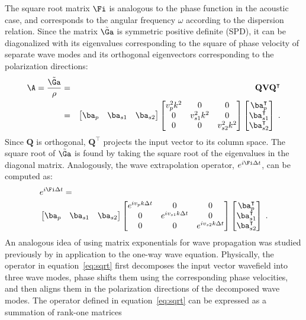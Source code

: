 The square root matrix $\Fi$ is analogous to the phase function in the acoustic case, and corresponds to the angular frequency $\omega$ according to the dispersion relation. Since the matrix $\tilde{\Ga}$ is symmetric positive definite (SPD), it can be diagonalized with its eigenvalues corresponding to the square of phase velocity of separate wave modes and its orthogonal eigenvectors corresponding to the polarization directions:
\begin{eqnarray}
    \label{eq:chris-eigen}
\A = \frac{\tilde{\Ga}}{\rho} &=& \mathbf{Q} \mathbf{V} \mathbf{Q}^\intercal \\ \nonumber 
&=& \begin{bmatrix} \ba_p & \ba_{s1} & \ba_{s2}\end{bmatrix} \begin{bmatrix} v_p^2 k^2 & 0 & 0 \\ 0 & v_{s1}^2 k^2 & 0 \\ 0 & 0 & v_{s2}^2 k^2 \end{bmatrix} \begin{bmatrix} \ba_p^\intercal \\ \ba_{s1}^\intercal \\ \ba_{s2}^\intercal \end{bmatrix} \;.
\end{eqnarray}
Since $\mathbf{Q}$ is orthogonal, $\mathbf{Q}^\intercal$ projects the input vector to its column space. The square root of $\tilde{\Ga}$ is found by taking the square root of the eigenvalues in the diagonal matrix. Analogously, the wave extrapolation operator, $e^{i\Fi \Delta t}$, can be computed as:
\begin{eqnarray}
\label{eq:sqrt}
&e^{i\Fi \Delta t} = \\ \nonumber
&\begin{bmatrix} \ba_p & \ba_{s1} & \ba_{s2}\end{bmatrix} \begin{bmatrix} 
e^{i v_p k \Delta t} & 0 & 0 \\ 
0 & e^{i v_{s1} k \Delta t} & 0 
\\ 0 & 0 & e^{i v_{s2} k \Delta t} 
\end{bmatrix} 
\begin{bmatrix} \ba_p^\intercal \\ \ba_{s1}^\intercal \\ \ba_{s2}^\intercal \end{bmatrix} \;.
\end{eqnarray}
An analogous idea of using matrix exponentials for wave propagation was studied previously by \cite{kosloff87} in application to the one-way wave equation. Physically, the operator in equation~\ref{eq:sqrt} first decomposes the input vector wavefield into three wave modes, phase shifts them using the corresponding phase velocities, and then aligns them in the polarization directions of the decomposed wave modes. The operator defined in equation~\ref{eq:sqrt} can be expressed as a summation of rank-one matrices
